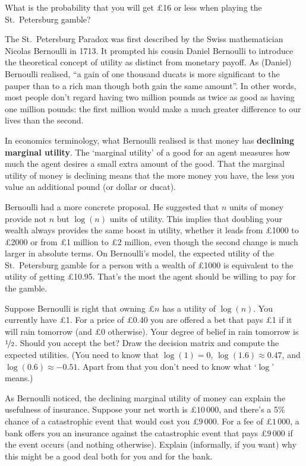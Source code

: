 \begin{exercise}{1}
  What is the probability that you will get £16 or less when playing
  the St.\ Petersburg gamble?
\end{exercise}

The St.\ Petersburg Paradox was first described by the Swiss mathematician
Nicolas Bernoulli in 1713. It prompted his cousin Daniel Bernoulli to introduce
the theoretical concept of utility as distinct from monetary payoff. As (Daniel)
Bernoulli realised, ``a gain of one thousand ducats is more significant to the
pauper than to a rich man though both gain the same amount''. In other words,
most people don't regard having two million pounds as twice as good as having
one million pounds: the first million would make a much greater difference to
our lives than the second.

In economics terminology, what Bernoulli realised is that money has
\textbf{declining marginal utility}. The `marginal utility' of a good for an
agent measures how much the agent desires a small extra amount of the good. That
the marginal utility of money is declining means that the more money you have,
the less you value an additional pound (or dollar or ducat).

Bernoulli had a more concrete proposal. He suggested that $n$ units of money
provide not $n$ but $\log(n)$ units of utility. This implies that doubling your
wealth always provides the same boost in utility, whether it leads from £1000 to
£2000 or from £1 million to £2 million, even though the second change is much
larger in absolute terms. On Bernoulli's model, the expected utility of the St.\
Petersburg gamble for a person with a wealth of £1000 is equivalent to the
utility of getting £10.95. That's the most the agent should be willing to pay
for the gamble.

\begin{exercise}{1}
  Suppose Bernoulli is right that owning £$n$ has a utility of $\log(n)$. You
  currently have £1. For a price of £0.40 you are offered a bet that pays £1 if
  it will rain tomorrow (and £0 otherwise). Your degree of belief in rain
  tomorrow is $\nicefrac{1}{2}$. Should you accept the bet? Draw the decision
  matrix and compute the expected utilities. (You need to know that
  $\log(1) = 0$, $\log(1.6) \approx 0.47$, and $\log(0.6) \approx -0.51$. Apart
  from that you don't need to know what `$\log$' means.)
\end{exercise}

\begin{exercise}{2}
  As Bernoulli noticed, the declining marginal utility of money can explain the
  usefulness of insurance. Suppose your net worth is £$10\,000$, and there's a
  5\% chance of a catastrophic event that would cost you £$9\,000$.
  For a fee of £$1\,000$, a bank offers you an insurance against the
  catastrophic event that pays £$9\,000$ if the event occurs (and nothing
  otherwise). Explain (informally, if you want) why this might be a good deal
  both for you and for the bank.
\end{exercise}

